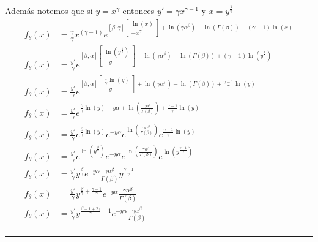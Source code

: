 \documentclass[12pt,]{article}
\begin{document}
Además notemos que si \(y=x^\gamma\) entonces \(y'=\gamma x^{\gamma-1}\)
y \(x=y^{\frac{1}{\gamma}}\) \[
\begin{array}{rl}
f_\theta(x) & = \frac{\gamma}{\gamma}x^{(\gamma-1)} e^{[\beta, \gamma]\begin{bmatrix}\ln(x) \\ -x^\gamma \end{bmatrix} +\ln(\gamma \alpha^\beta) -\ln(\Gamma(\beta))+(\gamma-1)\ln(x)}\\
f_\theta(x) & = \frac{y'}{\gamma} e^{[\beta, \alpha]\begin{bmatrix} \ln(y^{\frac{1}{\gamma}}) \\ -y \end{bmatrix} +\ln(\gamma \alpha^\beta) -\ln(\Gamma(\beta))+(\gamma-1)\ln(y^{\frac{1}{\gamma}})}\\
f_\theta(x) & = \frac{y'}{\gamma} e^{[\beta, \alpha]\begin{bmatrix} \frac{1}{\gamma}\ln(y) \\ -y \end{bmatrix} +\ln(\gamma \alpha^\beta) -\ln(\Gamma(\beta))+\frac{\gamma-1}{\gamma}\ln(y)}\\
f_\theta(x) & = \frac{y'}{\gamma} e^{\frac{\beta}{\gamma}\ln(y) -y\alpha +\ln(\frac{\gamma \alpha^\beta}{\Gamma(\beta)}) +\frac{\gamma-1}{\gamma}\ln(y)}\\
f_\theta(x) & = \frac{y'}{\gamma} e^{\frac{\beta}{\gamma}\ln(y)}e^{-y\alpha}e^{\ln(\frac{\gamma \alpha^\beta}{\Gamma(\beta)})} e^{\frac{\gamma-1}{\gamma}\ln(y)}\\
f_\theta(x) & = \frac{y'}{\gamma} e^{\ln(y^{\frac{\beta}{\gamma}})}e^{-y\alpha}e^{\ln(\frac{\gamma \alpha^\beta}{\Gamma(\beta)})} e^{\ln(y^\frac{\gamma-1}{\gamma})}\\
f_\theta(x) & = \frac{y'}{\gamma} y^{\frac{\beta}{\gamma}}e^{-y\alpha} \frac{\gamma \alpha^\beta}{\Gamma(\beta)} y^\frac{\gamma-1}{\gamma}\\
f_\theta(x) & = \frac{y'}{\gamma} y^{\frac{\beta}{\gamma}+\frac{\gamma-1}{\gamma}}e^{-y\alpha} \frac{\gamma \alpha^\beta}{\Gamma(\beta)} \\
f_\theta(x) & = \frac{y'}{\gamma} y^{\frac{\beta-1+2\gamma}{\gamma}-1}e^{-y\alpha} \frac{\gamma \alpha^\beta}{\Gamma(\beta)} \\
\end{array}
\]

\begin{center}\rule{0.5\linewidth}{\linethickness}\end{center}
\end{document}
